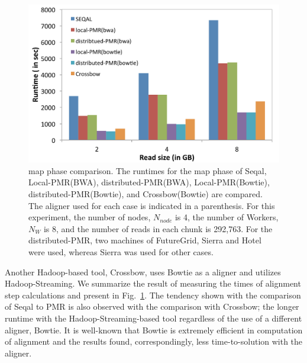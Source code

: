 \documentclass{acm_proc_article-sp}
\begin{document}
\begin{figure} 
 \centering
\includegraphics[scale=0.40]{figures/map_comp.pdf}
\caption{\small  map phase comparison.  The runtimes for the map phase of Seqal, Local-PMR(BWA), distributed-PMR(BWA), Local-PMR(Bowtie), distributed-PMR(Bowtie), and Crossbow(Bowtie) are compared.  The aligner used for each case is indicated in a parenthesis.  For this experiment, the number of nodes, $N_{node}$ is 4, the number of Workers, $N_W$ is 8, and the number of reads in each chunk is 292,763.  For the distributed-PMR, two machines of FutureGrid, Sierra and Hotel were used, whereas Sierra was used for other cases.}
  \label{fig:tool_comp} 
\end{figure}


Another Hadoop-based tool, Crossbow, uses Bowtie as a aligner and
utilizes Hadoop-Streaming\cite{hadoop-url}.  We summarize the result
of measuring the times of alignment step calculations and present in
Fig.~\ref{fig:tool_comp}.  The tendency shown with the comparison of
Seqal to PMR is also observed with the comparison with Crossbow; the
longer runtime with the Hadoop-Streaming-based tool regardless of the
use of a different aligner, Bowtie.  It is well-known that Bowtie is
extremely efficient in computation of alignment and the results found,
correspondingly, less time-to-solution with the aligner.
\end{document}

